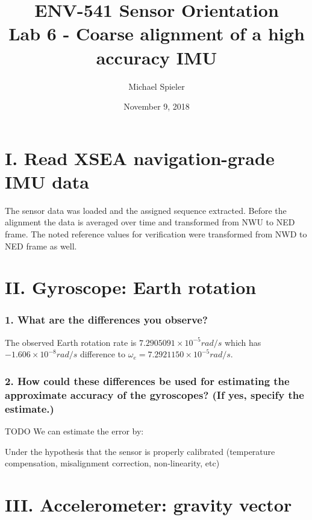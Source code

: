 \documentclass{article}
\title{ENV-541 Sensor Orientation\\Lab 6 - Coarse alignment of a high accuracy IMU}
\author{Michael Spieler}
\date{November 9, 2018}
\newcommand{\e}[1]{\times 10^{#1}} %
\begin{document}
\maketitle

\section*{I. Read XSEA navigation-grade IMU data}

The sensor data was loaded and the assigned sequence extracted.
Before the alignment the data is averaged over time and transformed from NWU to NED frame.
The noted reference values for verification were transformed from NWD to NED frame as well.

\section*{II. Gyroscope: Earth rotation}


\subsubsection*{1. What are the differences you observe?}

The observed Earth rotation rate is $7.2905091\e{-5} \si{rad/s}$ which has $-1.606\e{-8} \si{rad/s}$ difference to $\omega_e =  7.2921150\e{-5} \si{rad/s}$.

\subsubsection*{2. How could these differences be used for estimating the approximate accuracy
of the gyroscopes? (If yes, specify the estimate.)}

TODO
We can estimate the error by:

Under the hypothesis that the sensor is properly calibrated (temperature compensation, misalignment correction, non-linearity, etc)

\section*{III. Accelerometer: gravity vector}
\end{document}
